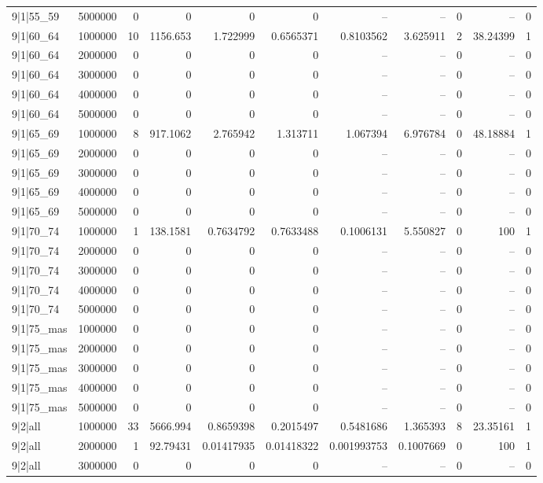 \begin{tabular}{lrrrrrrrrrr}
9|1|55\_59 & 5000000 & 0 & 0 & 0 & 0 & -- & -- & 0 & -- & 0 \\
9|1|60\_64 & 1000000 & 10 & 1156.653 & 1.722999 & 0.6565371 & 0.8103562 & 3.625911 & 2 & 38.24399 & 1 \\
9|1|60\_64 & 2000000 & 0 & 0 & 0 & 0 & -- & -- & 0 & -- & 0 \\
9|1|60\_64 & 3000000 & 0 & 0 & 0 & 0 & -- & -- & 0 & -- & 0 \\
9|1|60\_64 & 4000000 & 0 & 0 & 0 & 0 & -- & -- & 0 & -- & 0 \\
9|1|60\_64 & 5000000 & 0 & 0 & 0 & 0 & -- & -- & 0 & -- & 0 \\
9|1|65\_69 & 1000000 & 8 & 917.1062 & 2.765942 & 1.313711 & 1.067394 & 6.976784 & 0 & 48.18884 & 1 \\
9|1|65\_69 & 2000000 & 0 & 0 & 0 & 0 & -- & -- & 0 & -- & 0 \\
9|1|65\_69 & 3000000 & 0 & 0 & 0 & 0 & -- & -- & 0 & -- & 0 \\
9|1|65\_69 & 4000000 & 0 & 0 & 0 & 0 & -- & -- & 0 & -- & 0 \\
9|1|65\_69 & 5000000 & 0 & 0 & 0 & 0 & -- & -- & 0 & -- & 0 \\
9|1|70\_74 & 1000000 & 1 & 138.1581 & 0.7634792 & 0.7633488 & 0.1006131 & 5.550827 & 0 & 100 & 1 \\
9|1|70\_74 & 2000000 & 0 & 0 & 0 & 0 & -- & -- & 0 & -- & 0 \\
9|1|70\_74 & 3000000 & 0 & 0 & 0 & 0 & -- & -- & 0 & -- & 0 \\
9|1|70\_74 & 4000000 & 0 & 0 & 0 & 0 & -- & -- & 0 & -- & 0 \\
9|1|70\_74 & 5000000 & 0 & 0 & 0 & 0 & -- & -- & 0 & -- & 0 \\
9|1|75\_mas & 1000000 & 0 & 0 & 0 & 0 & -- & -- & 0 & -- & 0 \\
9|1|75\_mas & 2000000 & 0 & 0 & 0 & 0 & -- & -- & 0 & -- & 0 \\
9|1|75\_mas & 3000000 & 0 & 0 & 0 & 0 & -- & -- & 0 & -- & 0 \\
9|1|75\_mas & 4000000 & 0 & 0 & 0 & 0 & -- & -- & 0 & -- & 0 \\
9|1|75\_mas & 5000000 & 0 & 0 & 0 & 0 & -- & -- & 0 & -- & 0 \\
9|2|all & 1000000 & 33 & 5666.994 & 0.8659398 & 0.2015497 & 0.5481686 & 1.365393 & 8 & 23.35161 & 1 \\
9|2|all & 2000000 & 1 & 92.79431 & 0.01417935 & 0.01418322 & 0.001993753 & 0.1007669 & 0 & 100 & 1 \\
9|2|all & 3000000 & 0 & 0 & 0 & 0 & -- & -- & 0 & -- & 0 \\

\end{tabular}
